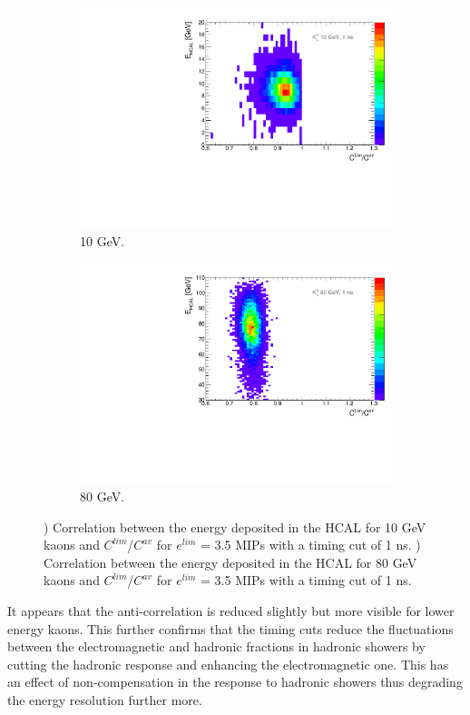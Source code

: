\begin{figure}[htbp!]
  \centering
  \begin{subfigure}[t]{0.45\textwidth}
    \centering
    \includegraphics[width=1\linewidth]{../Thesis_Plots/ILD/AdditionalPlots/Plots/EhcalCLimCav_1ns_10GeV.pdf}
    \caption{10 GeV.} \label{fig:EhcalCLimCav10_1ns}
  \end{subfigure}
  \hfill
  \begin{subfigure}[t]{0.45\textwidth}
    \centering
    \includegraphics[width=1\linewidth]{../Thesis_Plots/ILD/AdditionalPlots/Plots/EhcalCLimCav_1ns_80GeV.pdf}
    \caption{80 GeV.} \label{fig:EhcalCLimCav80_1ns}
  \end{subfigure}
  \caption{) Correlation between the energy deposited in the HCAL for 10 GeV kaons and $C^{lim}$/$C^{av}$ for $e^{lim}$ = 3.5 MIPs with a timing cut of 1 ns. ) Correlation between the energy deposited in the HCAL for 80 GeV kaons and $C^{lim}$/$C^{av}$ for $e^{lim}$ = 3.5 MIPs with a timing cut of 1 ns.}
\end{figure}

It appears that the anti-correlation is reduced slightly but more visible for lower energy kaons. This further confirms that the timing cuts reduce the fluctuations between the electromagnetic and hadronic fractions in hadronic showers by cutting the hadronic response and enhancing the electromagnetic one. This has an effect of non-compensation in the response to hadronic showers thus degrading the energy resolution further more.
